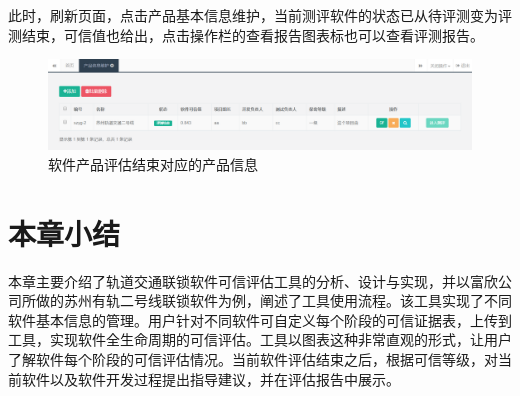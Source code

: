 此时，刷新页面，点击产品基本信息维护，当前测评软件的状态已从待评测变为评测结束，可信值也给出，点击操作栏的查看报告图表标也可以查看评测报告。
\begin{figure}[htb]
	\centering
	\includegraphics[width=13cm]{fig/sy5_23.png}
	\caption{软件产品评估结束对应的产品信息}
	\label{fig:5_23}
\end{figure}

\section{本章小结}
本章主要介绍了轨道交通联锁软件可信评估工具的分析、设计与实现，并以富欣公司所做的苏州有轨二号线联锁软件为例，阐述了工具使用流程。该工具实现了不同软件基本信息的管理。用户针对不同软件可自定义每个阶段的可信证据表，上传到工具，实现软件全生命周期的可信评估。工具以图表这种非常直观的形式，让用户了解软件每个阶段的可信评估情况。当前软件评估结束之后，根据可信等级，对当前软件以及软件开发过程提出指导建议，并在评估报告中展示。


 
 
 
 
 
